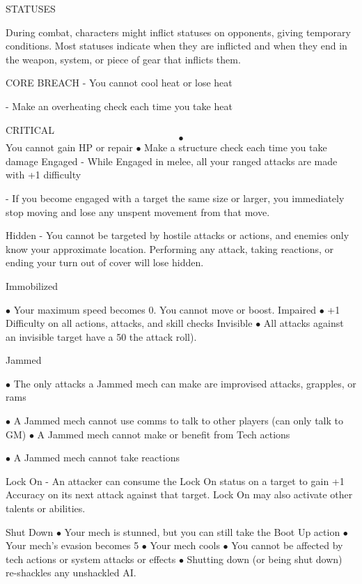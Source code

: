   STATUSES  

During combat, characters might inflict statuses on opponents, giving temporary conditions. Most  
statuses indicate when they are inflicted and when they end in the weapon, system, or piece of  
gear that inflicts them.  

CORE BREACH  
    -   You cannot cool heat or lose heat
 
    -   Make an overheating check each time you take heat
 
CRITICAL  
    $$\bullet$$   You cannot gain HP or repair  
    $\bullet$    Make a structure check each time you take damage  
Engaged  
    -   While Engaged in melee, all your ranged attacks are made with +1 difficulty
 
    -   If you become engaged with a target the same size or larger, you immediately stop  
        moving and lose any unspent movement from that move.
 
Hidden  
    -   You cannot be targeted by hostile attacks or actions, and enemies only know your  
        approximate location. Performing any attack, taking reactions, or ending your turn out of  
        cover will lose hidden.
 
Immobilized 
 
    $\bullet$    Your maximum speed becomes 0. You cannot move or boost.  
Impaired  
    $\bullet$    +1 Difficulty on all actions, attacks, and skill checks  
Invisible  
    $\bullet$    All attacks against an invisible target have a 50%
        the attack roll).
 
Jammed 
 
    $\bullet$    The only attacks a Jammed mech can make are improvised attacks, grapples, or rams
 
    $\bullet$    A Jammed mech cannot use comms to talk to other players (can only talk to GM)   
    $\bullet$    A Jammed mech cannot make or benefit from Tech actions
 
    $\bullet$    A Jammed mech cannot take reactions
 
Lock On  
    -   An attacker can consume the Lock On status on a target to gain +1 Accuracy on its next  
        attack against that target. Lock On may also activate other talents or abilities.
 
Shut Down   
    $\bullet$    Your mech is stunned, but you can still take the Boot Up action  
    $\bullet$    Your mech’s evasion becomes 5  
    $\bullet$    Your mech cools  
    $\bullet$    You cannot be affected by tech actions or system attacks or effects  
    $\bullet$    Shutting down (or being shut down) re-shackles any unshackled AI.
 
